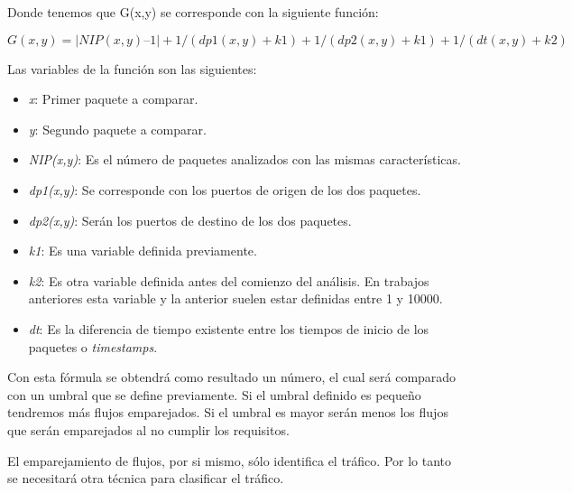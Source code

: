 \intro Donde tenemos que G(x,y) se corresponde con la siguiente función:

\begin{displaymath}
G(x,y) = |NIP(x,y) – 1| + 1 / (dp1(x,y) + k1) + 1 / (dp2(x,y) + k1) + 1 / (dt(x,y) + k2)
\end{displaymath}

\intro Las variables de la función son las siguientes: 

\begin{itemize}
\item \textit{x}: Primer paquete a comparar.
\item \textit{y}: Segundo paquete a comparar.
\item \textit{NIP(x,y)}: Es el número de paquetes analizados con las mismas características.
\item \textit{dp1(x,y)}: Se corresponde con los puertos de origen de los dos paquetes.
\item \textit{dp2(x,y)}: Serán los puertos de destino de los dos paquetes.
\item \textit{k1}: Es una variable definida previamente.
\item \textit{k2}: Es otra variable definida antes del comienzo del análisis. En trabajos anteriores esta variable 
y la anterior suelen estar definidas entre 1 y 10000.
\item \textit{dt}: Es la diferencia de tiempo existente entre los tiempos de inicio de los 
paquetes o \textit{timestamps}.
\end{itemize}

\intro Con esta fórmula se obtendrá como resultado un número, el cual será comparado con un umbral que se 
define previamente. Si el umbral definido es pequeño tendremos más flujos emparejados. Si el umbral es mayor 
serán menos los flujos que serán emparejados al no cumplir los requisitos.

\intro El emparejamiento de flujos, por si mismo, sólo identifica el tráfico. Por lo tanto se 
necesitará otra técnica para clasificar el tráfico.
